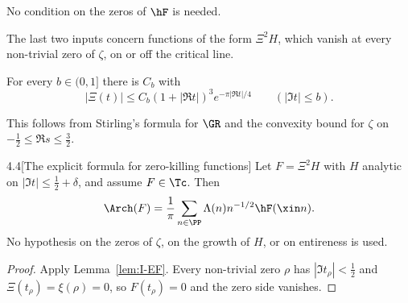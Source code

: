 No condition on the zeros of $\hF$ is needed.

The last two inputs concern functions of the form $\Xi^2H$, which vanish at every non-trivial zero of $\zeta$, on or off the critical line.

\begin{lemma}\label{lem:I-XB}
For every $b\in(0,1]$ there is $C_b$ with
\begin{equation}\label{eq:XB}
|\Xi(t)|\le C_b(1+|\Re t|)^3e^{-\pi|\Re t|/4}\qquad(|\Im t|\le b).
\end{equation}
\end{lemma}

This follows from Stirling's formula for $\GR$ and the convexity bound for $\zeta$ on $-\frac12\le\Re s\le\frac32$.

\begin{Icorollary}{4.4}[The explicit formula for zero-killing functions]\label{cor:I-zerokilling}
Let $F=\Xi^2H$ with $H$ analytic on $|\Im t|\le\frac12+\delta$, and assume $F\in\Tc$. Then
\[
\Arch(F)=\frac1\pi\sum_{n\in\PP}\Lambda(n)n^{-1/2}\hF(\xin n).
\]
No hypothesis on the zeros of $\zeta$, on the growth of $H$, or on entireness is used.
\end{Icorollary}

\begin{proof}
Apply Lemma~\ref{lem:I-EF}. Every non-trivial zero $\rho$ has $|\Im t_\rho|<\frac12$ and $\Xi(t_\rho)=\xi(\rho)=0$, so $F(t_\rho)=0$ and the
zero side vanishes.
\end{proof}
